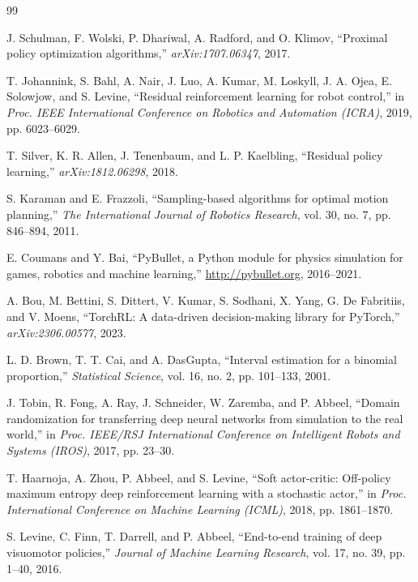 \documentclass[letterpaper, 11 pt, journal, twoside]{IEEEtran}
\begin{document}
\begin{thebibliography}{99}

J. Schulman, F. Wolski, P. Dhariwal, A. Radford, and O. Klimov, ``Proximal policy optimization algorithms,'' \emph{arXiv:1707.06347}, 2017.

T. Johannink, S. Bahl, A. Nair, J. Luo, A. Kumar, M. Loskyll, J. A. Ojea, E. Solowjow, and S. Levine, ``Residual reinforcement learning for robot control,'' in \emph{Proc. IEEE International Conference on Robotics and Automation (ICRA)}, 2019, pp. 6023--6029.

T. Silver, K. R. Allen, J. Tenenbaum, and L. P. Kaelbling, ``Residual policy learning,'' \emph{arXiv:1812.06298}, 2018.

S. Karaman and E. Frazzoli, ``Sampling-based algorithms for optimal motion planning,'' \emph{The International Journal of Robotics Research}, vol. 30, no. 7, pp. 846--894, 2011.

E. Coumans and Y. Bai, ``PyBullet, a Python module for physics simulation for games, robotics and machine learning,'' \url{http://pybullet.org}, 2016--2021.

A. Bou, M. Bettini, S. Dittert, V. Kumar, S. Sodhani, X. Yang, G. De Fabritiis, and V. Moens, ``TorchRL: A data-driven decision-making library for PyTorch,'' \emph{arXiv:2306.00577}, 2023.

L. D. Brown, T. T. Cai, and A. DasGupta, ``Interval estimation for a binomial proportion,'' \emph{Statistical Science}, vol. 16, no. 2, pp. 101--133, 2001.

J. Tobin, R. Fong, A. Ray, J. Schneider, W. Zaremba, and P. Abbeel, ``Domain randomization for transferring deep neural networks from simulation to the real world,'' in \emph{Proc. IEEE/RSJ International Conference on Intelligent Robots and Systems (IROS)}, 2017, pp. 23--30.

T. Haarnoja, A. Zhou, P. Abbeel, and S. Levine, ``Soft actor-critic: Off-policy maximum entropy deep reinforcement learning with a stochastic actor,'' in \emph{Proc. International Conference on Machine Learning (ICML)}, 2018, pp. 1861--1870.

S. Levine, C. Finn, T. Darrell, and P. Abbeel, ``End-to-end training of deep visuomotor policies,'' \emph{Journal of Machine Learning Research}, vol. 17, no. 39, pp. 1--40, 2016.


\end{thebibliography}
\end{document}
